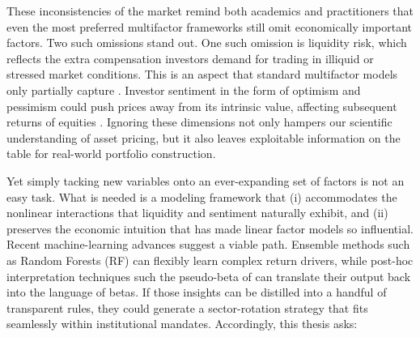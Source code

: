 
These inconsistencies of the market remind both academics and practitioners that even the most preferred multifactor frameworks still omit economically important factors. Two such omissions stand out. One such omission is liquidity risk, which reflects the extra compensation investors demand for trading in illiquid or stressed market conditions. This is an aspect that standard multifactor models only partially capture \cite{pastor_2003,acharya_2005}. Investor sentiment in the form of optimism and pessimism could push prices away from its intrinsic value, affecting subsequent returns of equities \cite{wurgler_2007}. Ignoring these dimensions not only hampers our scientific understanding of asset pricing, but it also leaves exploitable information on the table for real-world portfolio construction.

Yet simply tacking new variables onto an ever-expanding set of factors is not an easy task. What is needed is a modeling framework that (i) accommodates the nonlinear interactions that liquidity and sentiment naturally exhibit, and (ii) preserves the economic intuition that has made linear factor models so influential. Recent machine-learning advances suggest a viable path. Ensemble methods such as Random Forests (RF) can flexibly learn complex return drivers, while post-hoc interpretation techniques such the pseudo-beta of  can translate their output back into the language of betas. If those insights can be distilled into a handful of transparent rules, they could generate a sector-rotation strategy that fits seamlessly within institutional mandates. Accordingly, this thesis asks:

